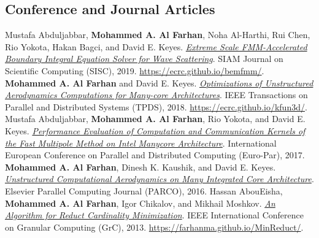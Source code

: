 \documentclass[10pt,a4paper]{moderncv}
\begin{document}
{{{  \subsection{Conference and Journal Articles}

  \cvitem{[7]}
  {
    Mustafa Abduljabbar,
    \textbf{Mohammed A. Al Farhan},
    Noha Al-Harthi, Rui Chen, Rio Yokota, Hakan Bagci, and David E. Keyes.
    \href{https://epubs.siam.org/doi/10.1137/18M1173599}
    {\textit{Extreme Scale FMM-Accelerated Boundary Integral Equation
    Solver for Wave Scattering}}.
    SIAM Journal on Scientific Computing (SISC), 2019. \newline
    \url{https://ecrc.github.io/bemfmm/}.
  }
  \cvitem{[8]}
  {
    \textbf{Mohammed A. Al Farhan} and David E. Keyes.
    \href{https://ieeexplore.ieee.org/document/8337750}
    {\textit{Optimizations of Unstructured Aerodynamics Computations
    for Many-core Architectures}}.
    IEEE Transactions on Parallel and Distributed Systems (TPDS), 2018.
    \newline
    \url{https://ecrc.github.io/kfun3d/}.
  }
  \cvitem{[9]}
  {
    Mustafa Abduljabbar,
    \textbf{Mohammed A. Al Farhan},
    Rio Yokota, and David E. Keyes.
    \href{https://link.springer.com/chapter/10.1007/978-3-319-64203-1_40}
    {\textit{Performance Evaluation of Computation and Communication
    Kernels of the Fast Multipole Method on Intel Manycore Architecture}}.
    International European Conference on Parallel and Distributed
    Computing (Euro-Par), 2017.
  }
  \cvitem{[10]}
  {
    \textbf{Mohammed A. Al Farhan},
    Dinesh K. Kaushik, and David E. Keyes.
    \href{https://www.sciencedirect.com/science/article/pii/S0167819116300564}
    {\textit{Unstructured Computational Aerodynamics on Many
    Integrated Core Architecture}}.
    Elsevier Parallel Computing Journal (PARCO), 2016.
  }
  \cvitem{[11]}
  {
    Hassan AbouEisha,
    \textbf{Mohammed A. Al Farhan},
    Igor Chikalov, and Mikhail Moshkov.
    \href{https://ieeexplore.ieee.org/document/6740370}
    {\textit{An Algorithm for Reduct Cardinality Minimization}}.
    IEEE International Conference on Granular Computing (GrC), 2013.\newline
    \url{https://farhanma.github.io/MinReduct/}.
  }
}

}}
\end{document}
